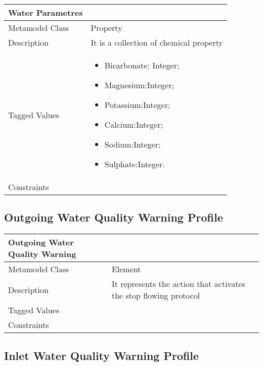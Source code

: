 \begin{longtable}{|p{7cm}|p{7cm}|}

\hline
\textbf{Water Parametres} & \\


\hline
Metamodel Class & Property\\

\hline
Description & It is a collection of chemical property\\

\hline
Tagged Values & 
\begin{itemize}
\item Bicarbonate: Integer;
\item Magnesium:Integer;
\item Potassium:Integer;
\item Calcium:Integer;
\item Sodium:Integer;
\item Sulphate:Integer.
\end{itemize}\\

\hline
Constraints &\\

\hline
\end{longtable}

\subsection{Outgoing Water Quality Warning Profile}

\begin{longtable}{|p{7cm}|p{7cm}|}

\hline
\textbf{Outgoing Water Quality Warning} & \\


\hline
Metamodel Class & Element\\

\hline
Description & It represents the action that activates the stop flowing protocol\\

\hline
Tagged Values &\\

\hline
Constraints &\\

\hline
\end{longtable}

\subsection{Inlet Water Quality Warning Profile}

